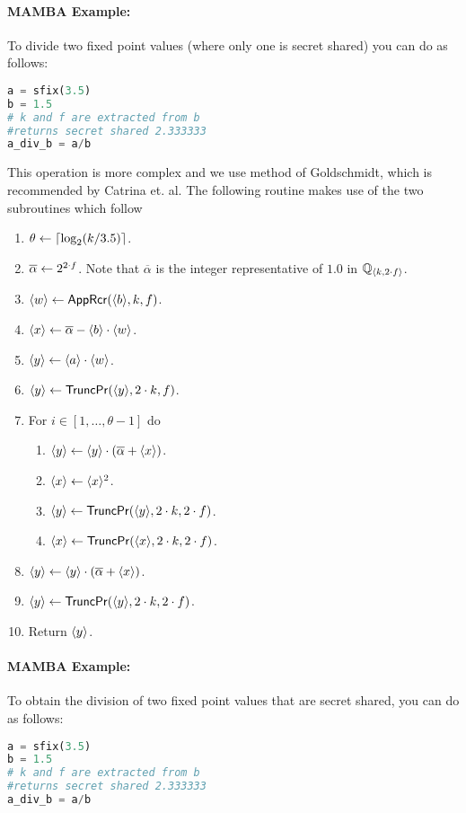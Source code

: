   \paragraph{MAMBA Example:} To divide two fixed point values (where only one is secret shared) you can do as follows:
  \begin{lstlisting}[language={python}]
a = sfix(3.5)
b = 1.5
# k and f are extracted from b
#returns secret shared 2.333333
a_div_b = a/b
\end{lstlisting}
  This operation is more complex and we use method of Goldschmidt, which
  is recommended by Catrina et. al.
  The following routine makes use of the two subroutines which follow
  \begin{enumerate}
    \item $\theta \leftarrow {\lceil \log_2 (k/3.5) \rceil}$.
    \item $\overline{\alpha} \leftarrow 2^{2 \cdot f}$.
          Note that $\overline{\alpha}$ is the integer representative of $1.0$ in ${\mathbb{Q}}_{\langle k, 2\cdot f \rangle}$.
    \item $\langle w \rangle \leftarrow \mathsf{AppRcr}(\langle b \rangle,k,f)$.
    \item $\langle x \rangle \leftarrow \overline{\alpha} - \langle b \rangle\cdot \langle w \rangle$.
    \item $\langle y \rangle \leftarrow \langle a \rangle\cdot \langle w \rangle$.
    \item $\langle y \rangle \leftarrow \mathsf{TruncPr}(\langle y \rangle,2\cdot k,f)$.
    \item For $i \in [1,\ldots,\theta-1]$ do
          \begin{enumerate}
            \item $\langle y \rangle \leftarrow \langle y \rangle \cdot (\overline{\alpha}+\langle x \rangle)$.
            \item $\langle x \rangle \leftarrow \langle x \rangle^2$.
            \item $\langle y \rangle \leftarrow \mathsf{TruncPr}(\langle y \rangle,2\cdot k,2 \cdot f)$.
            \item $\langle x \rangle \leftarrow \mathsf{TruncPr}(\langle x \rangle,2\cdot k,2 \cdot f)$.
          \end{enumerate}
    \item $\langle y \rangle \leftarrow \langle y \rangle \cdot (\overline{\alpha}+\langle x \rangle)$.
    \item $\langle y \rangle \leftarrow \mathsf{TruncPr}(\langle y \rangle,2\cdot k,2 \cdot f)$.
    \item Return $\langle y \rangle$.
  \end{enumerate}
  \paragraph{MAMBA Example:} To obtain the division of two fixed point values that are secret shared, you can do as follows:
  \begin{lstlisting}[language={python}]
a = sfix(3.5)
b = 1.5
# k and f are extracted from b
#returns secret shared 2.333333
a_div_b = a/b
\end{lstlisting}

